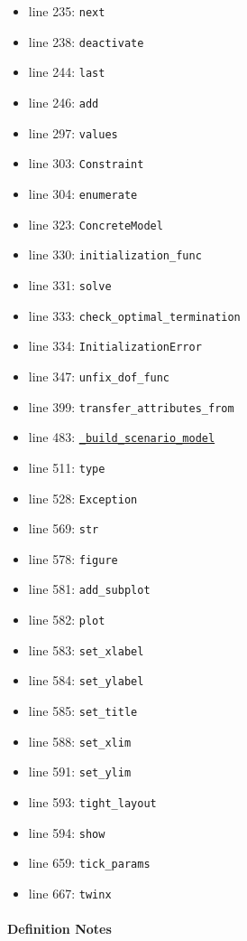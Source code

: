 \documentclass[11pt]{report}
\begin{document}
\begin{itemize}[leftmargin=*]
  \item line 235: \texttt{next}
  \item line 238: \texttt{deactivate}
  \item line 244: \texttt{last}
  \item line 246: \texttt{add}
  \item line 297: \texttt{values}
  \item line 303: \texttt{Constraint}
  \item line 304: \texttt{enumerate}
  \item line 323: \texttt{ConcreteModel}
  \item line 330: \texttt{initialization\_func}
  \item line 331: \texttt{solve}
  \item line 333: \texttt{check\_optimal\_termination}
  \item line 334: \texttt{InitializationError}
  \item line 347: \texttt{unfix\_dof\_func}
  \item line 399: \texttt{transfer\_attributes\_from}
  \item line 483: \hyperref[def:multiperiod-multiperiod.py:MultiPeriodModel.build_stochastic_multi_period._build_scenario_model:L385]{\texttt{\_build\_scenario\_model}}
  \item line 511: \texttt{type}
  \item line 528: \texttt{Exception}
  \item line 569: \texttt{str}
  \item line 578: \texttt{figure}
  \item line 581: \texttt{add\_subplot}
  \item line 582: \texttt{plot}
  \item line 583: \texttt{set\_xlabel}
  \item line 584: \texttt{set\_ylabel}
  \item line 585: \texttt{set\_title}
  \item line 588: \texttt{set\_xlim}
  \item line 591: \texttt{set\_ylim}
  \item line 593: \texttt{tight\_layout}
  \item line 594: \texttt{show}
  \item line 659: \texttt{tick\_params}
  \item line 667: \texttt{twinx}
\end{itemize}
\paragraph{Definition Notes}
\end{document}
